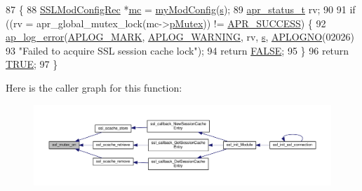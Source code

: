 \begin{DoxyCode}
87 \{
88     \hyperlink{structSSLModConfigRec}{SSLModConfigRec} *\hyperlink{group__APR__Util__MC_ga1cf8c9d89cfb411f224cae715e8c2aaa}{mc} = \hyperlink{group__MOD__SSL__PRIVATE_ga94fd702ebef715ed37309b2be90c68e8}{myModConfig}(\hyperlink{group__APACHE__CORE__LISTEN_ga9359ed159c8b295541e3770172d34550}{s});
89     \hyperlink{group__apr__errno_gaa5105fa83cc322f09382292db8b47593}{apr\_status\_t} rv;
90 
91     \textcolor{keywordflow}{if} ((rv = apr\_global\_mutex\_lock(mc->\hyperlink{structSSLModConfigRec_a98b0aeb6c70127d79a69b22d5682efb2}{pMutex})) != \hyperlink{group__apr__errno_ga9ee311b7bf1c691dc521d721339ee2a6}{APR\_SUCCESS}) \{
92         \hyperlink{group__APACHE__CORE__LOG_ga5e6676c87418af7a1d323a116c78ecb4}{ap\_log\_error}(\hyperlink{group__APACHE__CORE__LOG_ga655e126996849bcb82e4e5a14c616f4a}{APLOG\_MARK}, \hyperlink{group__APACHE__CORE__LOG_ga73e14aeff380a8a01c66d528162026fe}{APLOG\_WARNING}, rv, 
      \hyperlink{group__APACHE__CORE__LISTEN_ga9359ed159c8b295541e3770172d34550}{s}, \hyperlink{group__APACHE__CORE__LOG_ga1dee8a07e06bc5b3de8b89662c2cd666}{APLOGNO}(02026)
93                      \textcolor{stringliteral}{"Failed to acquire SSL session cache lock"});
94         \textcolor{keywordflow}{return} \hyperlink{group__MOD__SSL__PRIVATE_gaa93f0eb578d23995850d61f7d61c55c1}{FALSE};
95     \}
96     \textcolor{keywordflow}{return} \hyperlink{group__MOD__SSL__PRIVATE_gaa8cecfc5c5c054d2875c03e77b7be15d}{TRUE};
97 \}
\end{DoxyCode}


Here is the caller graph for this function\+:
\nopagebreak
\begin{figure}[H]
\begin{center}
\leavevmode
\includegraphics[width=350pt]{group__MOD__SSL__PRIVATE_gaf763e5ab5e24eb3db0cab1b3e72b82fa_icgraph}
\end{center}
\end{figure}


